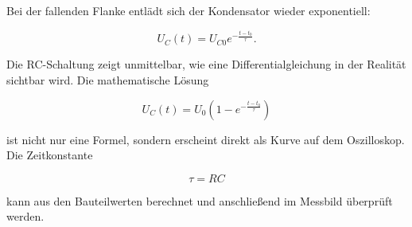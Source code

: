 Bei der fallenden Flanke entlädt sich der Kondensator wieder exponentiell:

\[
U_C(t)=U_{C0}e^{-\frac{t-t_0}{\tau}}.
\]

\begin{DidacticBox}
	\label{box:theorie-und-messung-rc-schaltung}
	Die RC-Schaltung zeigt unmittelbar, wie eine Differentialgleichung in der
	Realität sichtbar wird. Die mathematische Lösung
	
	\[
	U_C(t)=U_0\left(1-e^{-\frac{t-t_0}{\tau}}\right)
	\]
	
	ist nicht nur eine Formel, sondern erscheint direkt als Kurve auf dem
	Oszilloskop. Die Zeitkonstante
	
	\[
	\tau=RC
	\]
	
	kann aus den Bauteilwerten berechnet und anschließend im Messbild überprüft
	werden.
\end{DidacticBox}